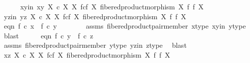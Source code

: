 \begin{isabellebody}
\ \ \ \ \isamarkupfalse%
\ xy{\isacharunderscore}{\kern0pt}in{\isacharcolon}{\kern0pt}\ {\isachardoublequoteopen}{\isasymlangle}x{\isacharcomma}{\kern0pt}y{\isasymrangle}\ {\isasymin}\isactrlbsub X\ {\isasymtimes}\isactrlsub c\ X\isactrlesub \ {\isacharparenleft}{\kern0pt}X\ \isactrlbsub f\isactrlesub {\isasymtimes}\isactrlsub c\isactrlbsub f\isactrlesub \ X{\isacharcomma}{\kern0pt}\ fibered{\isacharunderscore}{\kern0pt}product{\isacharunderscore}{\kern0pt}morphism\ X\ f\ f\ X{\isacharparenright}{\kern0pt}{\isachardoublequoteclose}\isanewline
\ \ \ \ \isamarkupfalse%
\ yz{\isacharunderscore}{\kern0pt}in{\isacharcolon}{\kern0pt}\ {\isachardoublequoteopen}{\isasymlangle}y{\isacharcomma}{\kern0pt}z{\isasymrangle}\ {\isasymin}\isactrlbsub X\ {\isasymtimes}\isactrlsub c\ X\isactrlesub \ {\isacharparenleft}{\kern0pt}X\ \isactrlbsub f\isactrlesub {\isasymtimes}\isactrlsub c\isactrlbsub f\isactrlesub \ X{\isacharcomma}{\kern0pt}\ fibered{\isacharunderscore}{\kern0pt}product{\isacharunderscore}{\kern0pt}morphism\ X\ f\ f\ X{\isacharparenright}{\kern0pt}{\isachardoublequoteclose}\isanewline
\isanewline
\ \ \ \ \isamarkupfalse%
\ eqn{}{\isacharcolon}{\kern0pt}\ {\isachardoublequoteopen}f\ {\isasymcirc}\isactrlsub c\ x\ {\isacharequal}{\kern0pt}\ f\ {\isasymcirc}\isactrlsub c\ y{\isachardoublequoteclose}\isanewline
\ \ \ \ \ \ \isamarkupfalse%
\ assms\ fibered{\isacharunderscore}{\kern0pt}product{\isacharunderscore}{\kern0pt}pair{\isacharunderscore}{\kern0pt}member\ x{\isacharunderscore}{\kern0pt}type\ xy{\isacharunderscore}{\kern0pt}in\ y{\isacharunderscore}{\kern0pt}type\ \isamarkupfalse%
\ blast\isanewline
\isanewline
\ \ \ \ \isamarkupfalse%
\ eqn{}{\isacharcolon}{\kern0pt}\ {\isachardoublequoteopen}f\ {\isasymcirc}\isactrlsub c\ y\ {\isacharequal}{\kern0pt}\ f\ {\isasymcirc}\isactrlsub c\ z{\isachardoublequoteclose}\isanewline
\ \ \ \ \ \ \isamarkupfalse%
\ assms\ fibered{\isacharunderscore}{\kern0pt}product{\isacharunderscore}{\kern0pt}pair{\isacharunderscore}{\kern0pt}member\ y{\isacharunderscore}{\kern0pt}type\ yz{\isacharunderscore}{\kern0pt}in\ z{\isacharunderscore}{\kern0pt}type\ \isamarkupfalse%
\ blast\isanewline
\isanewline
\ \ \ \ \isamarkupfalse%
\ {\isachardoublequoteopen}{\isasymlangle}x{\isacharcomma}{\kern0pt}z{\isasymrangle}\ {\isasymin}\isactrlbsub X\ {\isasymtimes}\isactrlsub c\ X\isactrlesub \ {\isacharparenleft}{\kern0pt}X\ \isactrlbsub f\isactrlesub {\isasymtimes}\isactrlsub c\isactrlbsub f\isactrlesub \ X{\isacharcomma}{\kern0pt}\ fibered{\isacharunderscore}{\kern0pt}product{\isacharunderscore}{\kern0pt}morphism\ X\ f\ f\ X{\isacharparenright}{\kern0pt}{\isachardoublequoteclose}\isanewline

\end{isabellebody}
